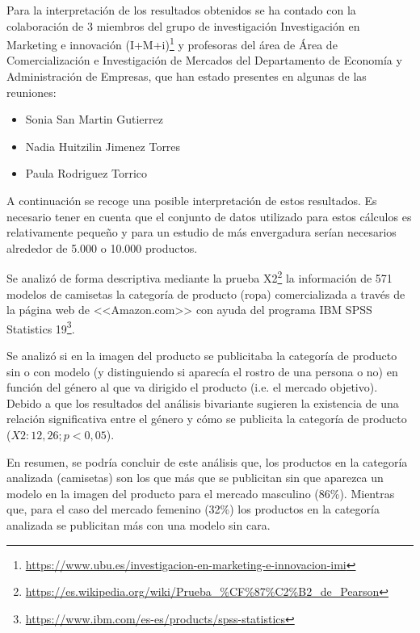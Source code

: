 Para la interpretación de los resultados obtenidos se ha contado con la colaboración de 3 miembros del grupo de investigación Investigación en Marketing e innovación (I+M+i)\footnote{\url{https://www.ubu.es/investigacion-en-marketing-e-innovacion-imi}} y profesoras del área de Área de Comercialización e Investigación de Mercados del Departamento de Economía y Administración de Empresas, que han estado presentes en algunas de las reuniones:

\begin{itemize}
    \item Sonia San Martin Gutierrez
    \item Nadia Huitzilin Jimenez Torres
    \item Paula Rodriguez Torrico
\end{itemize}

A continuación se recoge una posible interpretación de estos resultados. Es necesario tener en cuenta que el conjunto de datos utilizado para estos cálculos es relativamente pequeño y para un estudio de más envergadura serían necesarios alrededor de 5.000 o 10.000 productos.

Se analizó de forma descriptiva mediante la prueba X2\footnote{\url{https://es.wikipedia.org/wiki/Prueba_\%CF\%87\%C2\%B2_de_Pearson}} la información de 571 modelos de camisetas la categoría de producto (ropa) comercializada a través de la página web de <<Amazon.com>> con ayuda del programa IBM SPSS Statistics 19\footnote{\url{https://www.ibm.com/es-es/products/spss-statistics}}.

Se analizó si en la imagen del producto se publicitaba la categoría de producto sin o con modelo (y distinguiendo si aparecía el rostro de una persona o no) en función del género al que va dirigido el producto (i.e. el mercado objetivo). Debido a que los resultados del análisis bivariante sugieren la existencia de una relación significativa entre el género y cómo se publicita la categoría de producto ($X2: 12,26; p<0,05$).

En resumen, se podría concluir de este análisis que, los productos en la categoría analizada (camisetas) son los que más que se publicitan sin que aparezca un modelo en la imagen del producto para el mercado masculino (86\%). Mientras que, para el caso del mercado femenino (32\%) los productos en la categoría analizada se publicitan más con una modelo sin cara.